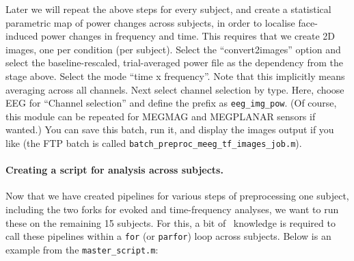 Later we will repeat the above steps for every subject, and create a statistical parametric map of power changes across subjects, in order to localise face-induced power changes in frequency and time. This requires that we create 2D images, one per condition (per subject). Select the ``convert2images'' option and select the baseline-rescaled, trial-averaged power file as the dependency from the stage above. Select the mode ``time x frequency''. Note that this implicitly means averaging across all channels. Next select channel selection by type. Here, choose EEG for ``Channel selection'' and define the prefix as \texttt{eeg\_img\_pow}. (Of course, this module can be repeated for MEGMAG and MEGPLANAR   sensors  if wanted.) You can save this batch, run it, and display the images output if you like (the FTP batch is called \texttt{batch\_preproc\_meeg\_tf\_images\_job.m}).

\paragraph{Creating a script for analysis across subjects.}

Now that we have created pipelines for various steps of preprocessing one subject, including the two forks for evoked and time-frequency analyses, we want to run these on the remaining 15 subjects. For this, a bit of \matlab\ knowledge is required to call these pipelines within a \texttt{for} (or \texttt{parfor}) loop across subjects. Below is an example from the \texttt{master\_script.m}:

